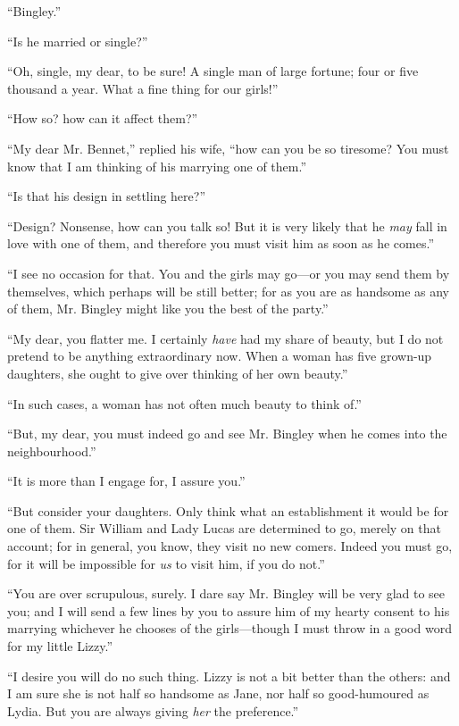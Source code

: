 \documentclass[12pt,openright]{book}
\begin{document}
“Bingley.”

“Is he married or single?”

“Oh, single, my dear, to be sure! A single man of large fortune; four or five thousand a year. What a fine thing for our girls!”

“How so? how can it affect them?”

“My dear Mr. Bennet,” replied his wife, “how can you be so tiresome? You must know that I am thinking of his marrying one of them.”

“Is that his design in settling here?”

“Design? Nonsense, how can you talk so! But it is very likely that he \textit{may} fall in love with one of them, and therefore you must visit him as soon as he comes.”

“I see no occasion for that. You and the girls may go—or you may send them by themselves, which perhaps will be still better; for as you are as handsome as any of them, Mr. Bingley might like you the best of the party.”

“My dear, you flatter me. I certainly \textit{have} had my share of beauty, but I do not pretend to be anything extraordinary now. When a woman has five grown-up daughters, she ought to give over thinking of her own beauty.”

“In such cases, a woman has not often much beauty to think of.”

“But, my dear, you must indeed go and see Mr. Bingley when he comes into the neighbourhood.”

“It is more than I engage for, I assure you.”

“But consider your daughters. Only think what an establishment it would be for one of them. Sir William and Lady Lucas are determined to go, merely on that account; for in general, you know, they visit no new comers. Indeed you must go, for it will be impossible for \textit{us} to visit him, if you do not.”

“You are over scrupulous, surely. I dare say Mr. Bingley will be very glad to see you; and I will send a few lines by you to assure him of my hearty consent to his marrying whichever he chooses of the girls—though I must throw in a good word for my little Lizzy.”

“I desire you will do no such thing. Lizzy is not a bit better than the others: and I am sure she is not half so handsome as Jane, nor half so good-humoured as Lydia. But you are always giving \textit{her} the preference.”
\end{document}
